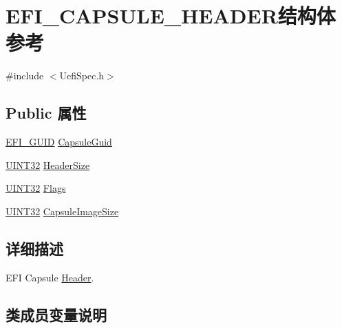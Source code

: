 \hypertarget{struct_e_f_i___c_a_p_s_u_l_e___h_e_a_d_e_r}{}\section{E\+F\+I\+\_\+\+C\+A\+P\+S\+U\+L\+E\+\_\+\+H\+E\+A\+D\+E\+R结构体 参考}
\label{struct_e_f_i___c_a_p_s_u_l_e___h_e_a_d_e_r}


{\ttfamily \#include $<$Uefi\+Spec.\+h$>$}

\subsection*{Public 属性}
\begin{DoxyCompactItemize}
\item 
\hyperlink{_uefi_base_type_8h_ad87614428813f71edb2c2d802e9ce2af}{E\+F\+I\+\_\+\+G\+U\+ID} \hyperlink{struct_e_f_i___c_a_p_s_u_l_e___h_e_a_d_e_r_aabd13044b99cd939d06eeb3241ccc7a7}{Capsule\+Guid}
\item 
\hyperlink{_processor_bind_8h_ae1e6edbbc26d6fbc71a90190d0266018}{U\+I\+N\+T32} \hyperlink{struct_e_f_i___c_a_p_s_u_l_e___h_e_a_d_e_r_a65fcb1130a6eb453f0a1345f776d96a7}{Header\+Size}
\item 
\hyperlink{_processor_bind_8h_ae1e6edbbc26d6fbc71a90190d0266018}{U\+I\+N\+T32} \hyperlink{struct_e_f_i___c_a_p_s_u_l_e___h_e_a_d_e_r_a81f79a67900df424a151f58ddf5e0130}{Flags}
\item 
\hyperlink{_processor_bind_8h_ae1e6edbbc26d6fbc71a90190d0266018}{U\+I\+N\+T32} \hyperlink{struct_e_f_i___c_a_p_s_u_l_e___h_e_a_d_e_r_a2240cf8de0ac77d08ffafb21acd95d79}{Capsule\+Image\+Size}
\end{DoxyCompactItemize}


\subsection{详细描述}
E\+FI Capsule \hyperlink{class_header}{Header}. 

\subsection{类成员变量说明}
\mbox{\label{struct_e_f_i___c_a_p_s_u_l_e___h_e_a_d_e_r_aabd13044b99cd939d06eeb3241ccc7a7}} 
